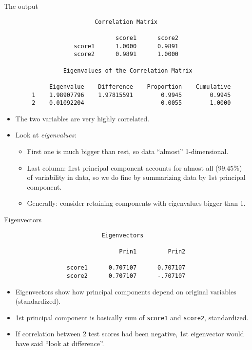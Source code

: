 \documentclass[pdf]{prosper}
\begin{document}
\begin{slide}{The output}

{\scriptsize
\begin{verbatim}
                          Correlation Matrix
 
                                score1      score2
                    score1      1.0000      0.9891
                    score2      0.9891      1.0000

                 Eigenvalues of the Correlation Matrix
 
             Eigenvalue    Difference    Proportion    Cumulative
        1    1.98907796    1.97815591        0.9945        0.9945
        2    0.01092204                      0.0055        1.0000
\end{verbatim}
}

\begin{itemize}
\item The two variables are very highly correlated.
\item Look at {\em eigenvalues}:
  \begin{itemize}
  \item First one is much bigger than rest, so data ``almost'' 1-dimensional.
  \item Last column: first principal component accounts for almost all (99.45\%) of variability in data, so we do fine by summarizing data by 1st principal component.
  \item Generally: consider retaining components with eigenvalues bigger than 1.
  \end{itemize}
\end{itemize}
  
\end{slide}

\begin{slide}{Eigenvectors}

{\scriptsize
\begin{verbatim}
                            Eigenvectors
 
                                 Prin1         Prin2

                  score1      0.707107      0.707107
                  score2      0.707107      -.707107
\end{verbatim}
}

\begin{itemize}
\item Eigenvectors show how principal components depend on original variables (standardized).
\item 1st principal component is basically sum of \verb-score1- and \verb-score2-, standardized.
\item If correlation between 2 test scores had been negative, 1st eigenvector would have said ``look at difference''.
\end{itemize}
\end{slide}
\end{document}
